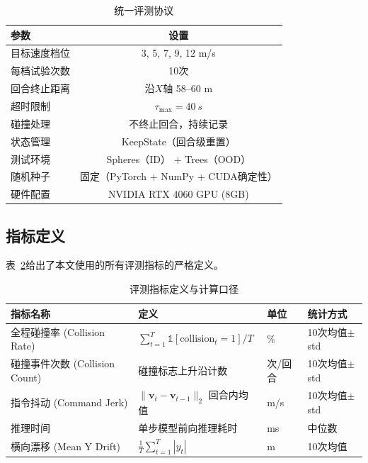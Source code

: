 \begin{table}[!htbp]
\centering
\caption{统一评测协议}
\label{tab:eval_protocol_unified}
\begin{tabular}{lc}
\toprule
\textbf{参数} & \textbf{设置} \\
\midrule
目标速度档位 & 3, 5, 7, 9, 12 m/s \\
每档试验次数 & 10次 \\
回合终止距离 & 沿$X$轴 58--60 m \\
超时限制 & $\tau_{\max} = \SI{40}{s}$ \\
碰撞处理 & 不终止回合，持续记录 \\
状态管理 & KeepState（回合级重置） \\
测试环境 & Spheres（ID） + Trees（OOD） \\
随机种子 & 固定（PyTorch + NumPy + CUDA确定性） \\
硬件配置 & NVIDIA RTX 4060 GPU (8GB) \\
\bottomrule
\end{tabular}
\end{table}

\FloatBarrier

\subsection{指标定义}

表~\ref{tab:metric_def}给出了本文使用的所有评测指标的严格定义。

\begin{table}[!htbp]
\centering
\caption{评测指标定义与计算口径}
\label{tab:metric_def}
\begin{tabular}{p{2.5cm}p{5.5cm}p{2.5cm}p{2.0cm}}
\toprule
\textbf{指标名称} & \textbf{定义} & \textbf{单位} & \textbf{统计方式} \\
\midrule
全程碰撞率 (Collision Rate) & $\sum_{t=1}^{T}\mathbb{1}[\text{collision}_t=1] / T$ & \% & 10次均值$\pm$std \\
碰撞事件次数 (Collision Count) & 碰撞标志上升沿计数 & 次/回合 & 10次均值$\pm$std \\
指令抖动 (Command Jerk) & $\|\mathbf{v}_t - \mathbf{v}_{t-1}\|_2$ 回合内均值 & m/s & 10次均值$\pm$std \\
推理时间 & 单步模型前向推理耗时 & ms & 中位数 \\
横向漂移 (Mean Y Drift) & $\frac{1}{T}\sum_{t=1}^{T}|y_t|$ & m & 10次均值 \\
\bottomrule
\end{tabular}
\end{table}

